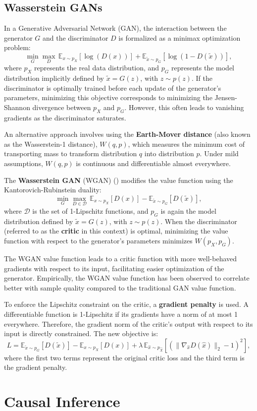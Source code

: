 \subsection{Wasserstein GANs}

In a Generative Adversarial Network (GAN),
the interaction between the generator \( G \) and the discriminator
\( D \) is formalized as a minimax optimization problem:
\begin{equation}
\min_G \max_D \, \mathbb{E}_{x \sim p_X}[\log(D(x))] + \mathbb{E}_{\tilde{x} \sim p_G}[\log(1 - D(\tilde{x}))],
\end{equation}
where \( p_X \) represents the real data distribution,
and \( p_G \) represents the model distribution implicitly defined by
\(\tilde{x} = G(z)\), with \( z \sim p(z) \). If the discriminator
is optimally trained before each update of the generator's parameters,
minimizing this objective corresponds to minimizing the
Jensen-Shannon divergence between \( p_X \) and \( p_G \).
However, this often leads to vanishing gradients as the discriminator saturates.

An alternative approach involves using the \textbf{Earth-Mover distance}
(also known as the Wasserstein-1 distance),
\( W(q, p) \), which measures the minimum cost of transporting mass
to transform distribution \( q \) into distribution \( p \).
Under mild assumptions, \( W(q, p) \) is continuous and differentiable
almost everywhere.

The \textbf{Wasserstein GAN} (WGAN) (\cite{gulrajani2017}) modifies the value
function using the Kantorovich-Rubinstein duality:
\[
\min_G \max_{D \in \mathcal{D}} \, \mathbb{E}_{x \sim p_X}[D(x)] - \mathbb{E}_{\tilde{x} \sim p_G}[D(\tilde{x})],
\]
where \( \mathcal{D} \) is the set of 1-Lipschitz functions,
and \( p_G \) is again the model distribution defined by \(\tilde{x} = G(z)\),
with \( z \sim p(z) \). When the discriminator (referred to as the \textbf{critic}
in this context) is optimal, minimizing the value function with respect
to the generator's parameters minimizes \( W(p_X, p_G) \).

The WGAN value function leads to a critic function with more well-behaved
gradients with respect to its input, facilitating easier optimization
of the generator. Empirically, the WGAN value function has been observed
to correlate better with sample quality compared to the traditional GAN value
function.

To enforce the Lipschitz constraint on the critic, a \textbf{gradient penalty}
is used.
A differentiable function is 1-Lipschitz if its gradients have a norm of at most
1 everywhere. Therefore, the gradient norm of the critic's output with respect
to its input is directly constrained. The new objective is:
\[
L = \mathbb{E}_{\tilde{x} \sim p_G}[D(\tilde{x})] - \mathbb{E}_{x \sim p_X}[D(x)] + \lambda \, \mathbb{E}_{\hat{x} \sim p_{\hat{X}}}[(\|\nabla_{\hat{x}} D(\hat{x})\|_2 - 1)^2],
\]
where the first two terms represent the original critic loss and the
third term is the gradient penalty.

\section{Causal Inference}

\cite{Neal_2020a}
